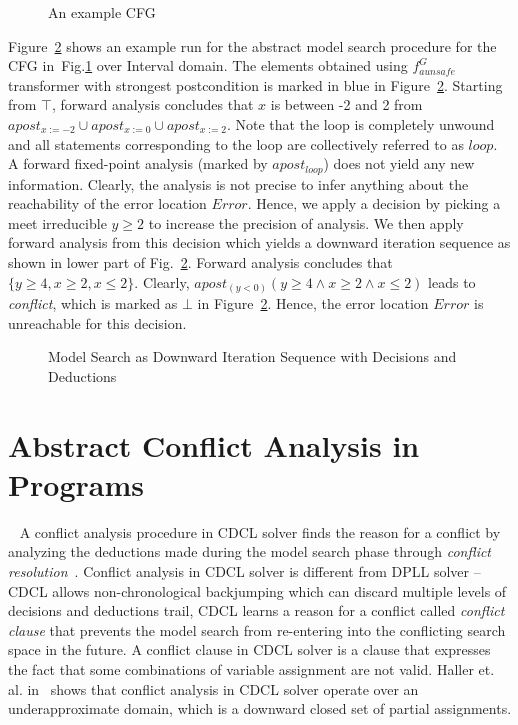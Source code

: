 \begin{example}
%
\begin{figure}
\centering
{}
\caption{An example CFG \label{fig:ex-ac}}
\end{figure}
%
Figure~\ref{model-search} shows an example run for the abstract model search procedure 
for the CFG in~Fig.\ref{fig:ex-ac} over Interval domain.  The elements obtained 
using $f_{aunsafe}^{G}$ transformer with strongest postcondition is marked 
in blue in Figure~\ref{model-search}.  
Starting from $\top$, forward analysis concludes that $x$ is between -2 and 2
from $apost_{x:=-2} \cup apost_{x:=0} \cup apost_{x:=2}$.  Note that the loop is completely 
unwound and all statements corresponding to the loop are collectively referred to as $loop$. 
A forward fixed-point analysis (marked by $apost_{loop}$) does not yield any new 
information. Clearly, the analysis
is not precise to infer anything about the reachability of the error location $Error$. 
Hence, we apply a decision by picking a meet irreducible $y\geq 2$ to increase the 
precision of analysis.  We then apply forward analysis from this decision which
yields a downward iteration sequence as shown in lower part of
Fig.~\ref{model-search}.  Forward analysis concludes that $\{y \geq 4, x \geq 2, x \leq 2\}$. 
Clearly, $apost_{(y < 0)}(y \geq 4 \wedge x \geq 2 \wedge x \leq 2)$ leads to \emph{conflict}, 
which is marked as $\bot$ in Figure~\ref{model-search}. Hence, the error location $Error$ is 
unreachable for this decision. 
\end{example}
%
\begin{figure}[t]
\centering
\vspace*{-0.2cm}
  \caption{Model Search as Downward Iteration Sequence with Decisions and
  Deductions}
\label{model-search}
\end{figure}
%
\section{Abstract Conflict Analysis in Programs}~\label{conflict-analysis}
%
A conflict analysis procedure in CDCL solver finds the reason for 
a conflict by analyzing the deductions made during the 
model search phase through \emph{conflict resolution}~\cite{cdcl}. 
Conflict analysis in CDCL solver is different from DPLL solver -- 
CDCL allows non-chronological backjumping which can discard 
multiple levels of decisions and deductions trail, CDCL learns a 
reason for a conflict called \emph{conflict clause} that prevents 
the model search from re-entering into the conflicting search space 
in the future.  A conflict clause in CDCL solver is a clause that 
expresses the fact that some combinations of variable assignment 
are not valid.  Haller et. al. in~\cite{sas12} shows that conflict 
analysis in CDCL solver operate over an underapproximate domain, 
which is a downward closed set of partial assignments. 
%


